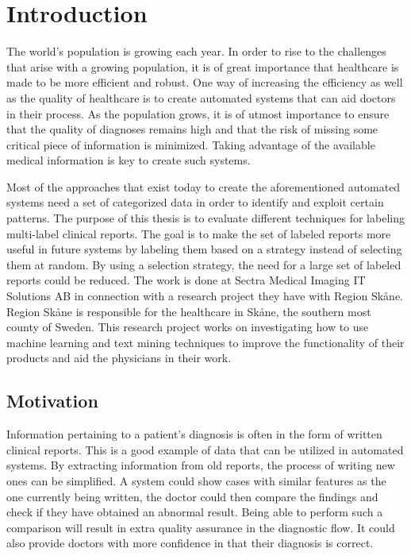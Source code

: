 \chapter{Introduction}
\label{cha:introduction}

The world's population is growing each year. 
In order to rise to the challenges that arise with a growing population, it is of great importance that healthcare is made to be more efficient and robust.
One way of increasing the efficiency as well as the quality of healthcare is to create automated systems that can aid doctors in their process.
As the population grows, it is of utmost importance to ensure that the quality of diagnoses remains high and that the risk of missing some critical piece of information is minimized.
Taking advantage of the available medical information is key to create such systems.

Most of the approaches that exist today to create the aforementioned automated systems need a set of categorized data in order to identify and exploit certain patterns.
The purpose of this thesis is to evaluate different techniques for labeling multi-label clinical reports.
The goal is to make the set of labeled reports more useful in future systems by labeling them based on a strategy instead of selecting them at random.
By using a selection strategy, the need for a large set of labeled reports could be reduced.
The work is done at Sectra Medical Imaging IT Solutions AB in connection with a research project they have with Region Skåne.
Region Skåne is responsible for the healthcare in Skåne, the southern most county of Sweden.
This research project works on investigating how to use machine learning and text mining techniques to improve the functionality of their products and aid the physicians in their work.

\section{Motivation}
\label{sec:motivation}

Information pertaining to a patient's diagnosis is often in the form of written clinical reports.
This is a good example of data that can be utilized in automated systems.
By extracting information from old reports, the process of writing new ones can be simplified.
A system could show cases with similar features as the one currently being written, the doctor could then compare the findings and check if they have obtained an abnormal result.
Being able to perform such a comparison will result in extra quality assurance in the diagnostic flow.
It could also provide doctors with more confidence in that their diagnosis is correct.

